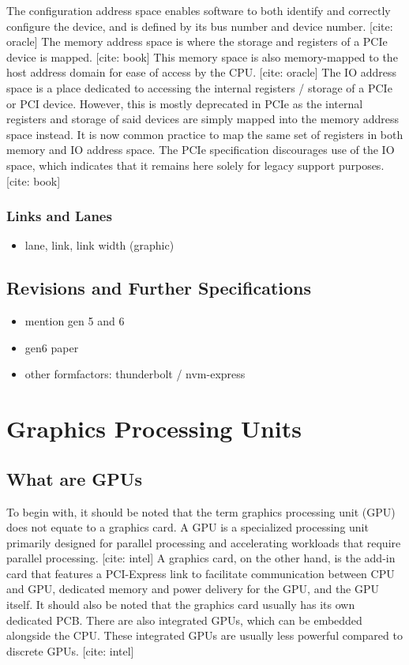 The configuration address space enables software to both identify and correctly configure the device, and is defined by its bus number and device number. [cite: oracle]
The memory address space is where the storage and registers of a PCIe device is mapped. [cite: book] This memory space is also memory-mapped to the host address domain for ease of access by the CPU. [cite: oracle] 
The IO address space is a place dedicated to accessing the internal registers / storage of a PCIe or PCI device. However, this is mostly deprecated in PCIe as the internal registers and storage of said devices are simply mapped into the memory address space instead. It is now common practice to map the same set of registers in both memory and IO address space. The PCIe specification discourages use of the IO space, which indicates that it remains here solely for legacy support purposes. [cite: book]

\subsubsection{Links and Lanes}

\begin{itemize}
\item lane, link, link width (graphic)
\end{itemize}

\subsection{Revisions and Further Specifications}

\begin{itemize}
\item mention gen 5 and 6
\item gen6 paper
\item other formfactors: thunderbolt / nvm-express
\end{itemize}

\section{Graphics Processing Units}


\subsection{What are GPUs}
To begin with, it should be noted that the term graphics processing unit (GPU) does not equate to a graphics card. A GPU is a specialized processing unit primarily designed for parallel processing and accelerating workloads that require parallel processing. [cite: intel] A graphics card, on the other hand, is the add-in card that features a PCI-Express link to facilitate communication between CPU and GPU, dedicated memory and power delivery for the GPU, and the GPU itself. It should also be noted that the graphics card usually has its own dedicated PCB. There are also integrated GPUs, which can be embedded alongside the CPU.  These integrated GPUs are usually less powerful compared to discrete GPUs. [cite: intel]

